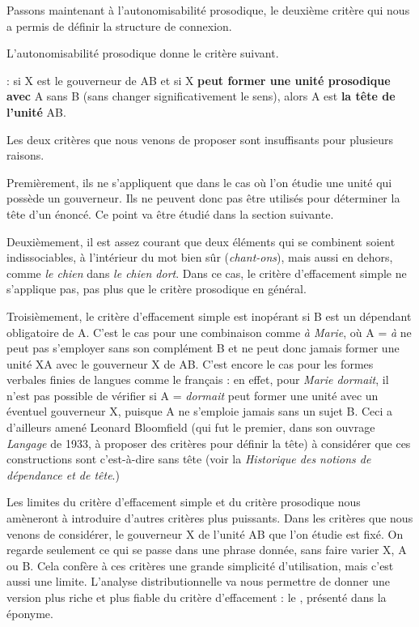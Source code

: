 Passons maintenant à l’autonomisabilité prosodique, le deuxième critère qui nous a permis de définir la structure de connexion.

L’autonomisabilité prosodique donne le critère suivant.

{: si X est le gouverneur de AB et si X \textbf{peut former une unité prosodique avec} A sans B (sans changer significativement le sens), alors A est \textbf{la tête de l’unité} AB.}

Les deux critères que nous venons de proposer sont insuffisants pour plusieurs raisons.

Premièrement, ils ne s’appliquent que dans le cas où l’on étudie une unité qui possède un gouverneur. Ils ne peuvent donc pas être utilisés pour déterminer la tête d’un énoncé. Ce point va être étudié dans la section suivante.

Deuxièmement, il est assez courant que deux éléments qui se combinent soient indissociables, à l’intérieur du mot bien sûr (\textit{chant-ons}), mais aussi en dehors, comme \textit{le chien} dans \textit{le chien dort}. Dans ce cas, le critère d’effacement simple ne s’applique pas, pas plus que le critère prosodique en général.

Troisièmement, le critère d’effacement simple est inopérant si B est un dépendant obligatoire de A. C’est le cas pour une combinaison comme \textit{à Marie}, où A = \textit{à} ne peut pas s’employer sans son complément B et ne peut donc jamais former une unité XA avec le gouverneur X de AB. C’est encore le cas pour les formes verbales finies de langues comme le français : en effet, pour \textit{Marie dormait}, il n’est pas possible de vérifier si A = \textit{dormait} peut former une unité avec un éventuel gouverneur X, puisque A ne s’emploie jamais sans un sujet B. Ceci a d’ailleurs amené Leonard Bloomfield (qui fut le premier, dans son ouvrage \textit{Langage} de 1933, à proposer des critères pour définir la tête) à considérer que ces constructions sont  c’est-à-dire sans tête (voir la  \textit{Historique des notions de dépendance et de tête}.)

Les limites du critère d’effacement simple et du critère prosodique nous amèneront à introduire d’autres critères plus puissants. Dans les critères que nous venons de considérer, le gouverneur X de l’unité AB que l’on étudie est fixé. On regarde seulement ce qui se passe dans une phrase donnée, sans faire varier X, A ou B. Cela confère à ces critères une grande simplicité d’utilisation, mais c’est aussi une limite. L’analyse distributionnelle va nous permettre de donner une version plus riche et plus fiable du critère d’effacement : le , présenté dans la  éponyme.

